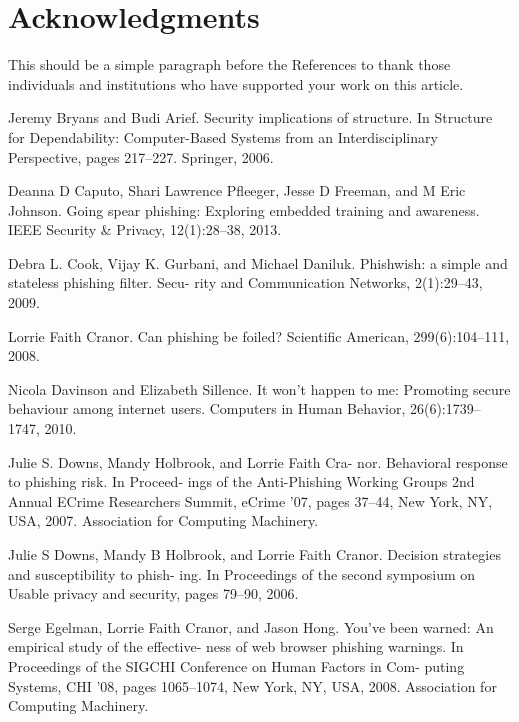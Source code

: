 \documentclass[lettersize,journal]{IEEEtran}
\begin{document}
\section*{Acknowledgments}
This should be a simple paragraph before the References to thank those individuals and institutions who have supported your work on this article.

\begin{thebibliography}{1}
  

  Jeremy Bryans and Budi Arief. Security implications of structure. In Structure for Dependability: Computer-Based Systems from an Interdisciplinary Perspective, pages 217–227. Springer, 2006.

  Deanna D Caputo, Shari Lawrence Pfleeger, Jesse D
  Freeman, and M Eric Johnson. Going spear phishing:
  Exploring embedded training and awareness. IEEE
  Security & Privacy, 12(1):28–38, 2013.

  Debra L. Cook, Vijay K. Gurbani, and Michael Daniluk.
  Phishwish: a simple and stateless phishing filter. Secu-
  rity and Communication Networks, 2(1):29–43, 2009.

  Lorrie Faith Cranor. Can phishing be foiled? Scientific
  American, 299(6):104–111, 2008.

  Nicola Davinson and Elizabeth Sillence. It won’t happen
  to me: Promoting secure behaviour among internet users.
  Computers in Human Behavior, 26(6):1739–1747, 2010.

  Julie S. Downs, Mandy Holbrook, and Lorrie Faith Cra-
  nor. Behavioral response to phishing risk. In Proceed-
  ings of the Anti-Phishing Working Groups 2nd Annual
  ECrime Researchers Summit, eCrime ’07, pages 37–44,
  New York, NY, USA, 2007. Association for Computing
  Machinery.

  Julie S Downs, Mandy B Holbrook, and Lorrie Faith
  Cranor. Decision strategies and susceptibility to phish-
  ing. In Proceedings of the second symposium on Usable
  privacy and security, pages 79–90, 2006.

  Serge Egelman, Lorrie Faith Cranor, and Jason Hong.
  You’ve been warned: An empirical study of the effective-
  ness of web browser phishing warnings. In Proceedings
  of the SIGCHI Conference on Human Factors in Com-
  puting Systems, CHI ’08, pages 1065–1074, New York,
  NY, USA, 2008. Association for Computing Machinery.


\end{thebibliography}
\end{document}
